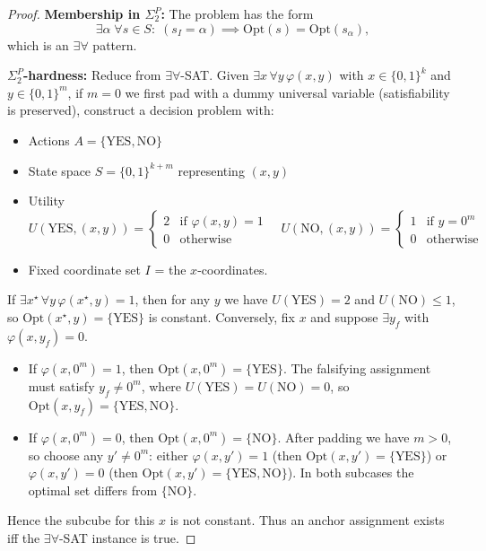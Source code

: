 \begin{proof}
\textbf{Membership in $\Sigma_2^P$:} The problem has the form
\[
\exists \alpha \;\forall s \in S: \; (s_I = \alpha) \implies \text{Opt}(s) = \text{Opt}(s_\alpha),
\]
which is an $\exists\forall$ pattern.

\textbf{$\Sigma_2^P$-hardness:} Reduce from $\exists\forall$-SAT. Given
$\exists x \, \forall y \, \varphi(x,y)$ with $x \in \{0,1\}^k$ and $y \in \{0,1\}^m$,
if $m=0$ we first pad with a dummy universal variable (satisfiability is preserved),
construct a decision problem with:
\begin{itemize}
  \item Actions $A = \{\text{YES}, \text{NO}\}$
  \item State space $S = \{0,1\}^{k+m}$ representing $(x,y)$
  \item Utility
  \[
    U(\text{YES}, (x,y)) =
      \begin{cases}
        2 & \text{if } \varphi(x,y)=1 \\
        0 & \text{otherwise}
      \end{cases}
    \quad
    U(\text{NO}, (x,y)) =
      \begin{cases}
        1 & \text{if } y = 0^m \\
        0 & \text{otherwise}
      \end{cases}
  \]
  \item Fixed coordinate set $I$ = the $x$-coordinates.
\end{itemize}

If $\exists x^\star \, \forall y \, \varphi(x^\star,y)=1$, then for any $y$ we have
$U(\text{YES})=2$ and $U(\text{NO})\le 1$, so $\text{Opt}(x^\star,y)=\{\text{YES}\}$ is constant.
Conversely, fix $x$ and suppose $\exists y_f$ with $\varphi(x,y_f)=0$.
\begin{itemize}
\item If $\varphi(x,0^m)=1$, then $\text{Opt}(x,0^m)=\{\text{YES}\}$. The falsifying assignment must satisfy $y_f\neq 0^m$, where $U(\text{YES})=U(\text{NO})=0$, so $\text{Opt}(x,y_f)=\{\text{YES},\text{NO}\}$.
\item If $\varphi(x,0^m)=0$, then $\text{Opt}(x,0^m)=\{\text{NO}\}$. After padding we have $m>0$, so choose any $y'\neq 0^m$: either $\varphi(x,y')=1$ (then $\text{Opt}(x,y')=\{\text{YES}\}$) or $\varphi(x,y')=0$ (then $\text{Opt}(x,y')=\{\text{YES},\text{NO}\}$). In both subcases the optimal set differs from $\{\text{NO}\}$.
\end{itemize}
Hence the subcube for this $x$ is not constant. Thus an anchor assignment exists iff the $\exists\forall$-SAT instance is true.
\end{proof}

